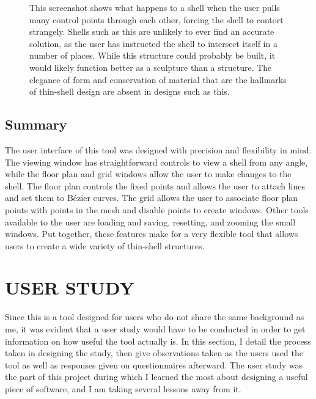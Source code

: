 \documentclass{thesis}
\begin{document}
\begin{figure}
\caption[A tangled mess]{This screenshot shows what happens to a shell when the user pulls many control points through each other,
forcing the shell to contort strangely.  Shells such as this are unlikely to ever find an accurate solution, as the user has
instructed the shell to intersect itself in a number of places.  While this structure could probably be built, it would likely function
better as a sculpture than a structure.  The elegance of form and conservation of material that are the hallmarks of thin-shell
design are absent in designs such as this.}
\label{fig:tangle1}
\end{figure}

\section{Summary}
The user interface of this tool was designed with precision and flexibility in mind.  The viewing window has straightforward controls
to view a shell from any angle, while the floor plan and grid windows allow the user to make changes to the shell.  The floor plan
controls the fixed points and allows the user to attach lines and set them to B\'{e}zier curves.  The grid allows the user to associate
floor plan points with points in the mesh and disable points to create windows.  Other tools available to the user are loading and
saving, resetting, and zooming the small windows.  Put together, these features make for a very flexible tool that allows users to
create a wide variety of thin-shell structures.


\chapter{USER STUDY}
Since this is a tool designed for users who do not share the same background as me, it was evident that a user study would have to be
conducted in order to get information on how useful the tool actually is.  In this section, I detail the process taken in designing
the study, then give observations taken as the users used the tool as well as responses given on questionnaires afterward.  The user
study was the part of this project during which I learned the most about designing a useful piece of software, and I am taking several
lessons away from it.
\end{document}
